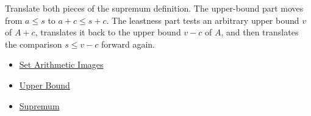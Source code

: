 \begin{remark*}
Translate both pieces of the supremum definition. The upper-bound part moves
from \(a\le s\) to \(a+c\le s+c\). The leastness part tests an arbitrary upper
bound \(v\) of \(A+c\), translates it back to the upper bound \(v-c\) of
\(A\), and then translates the comparison \(s\le v-c\) forward again.
\end{remark*}

\begin{dependencies}
\begin{itemize}
  \item \hyperref[def:set-arithmetic-images]{Set Arithmetic Images}
  \item \hyperref[def:real-upper-bound]{Upper Bound}
  \item \hyperref[def:supremum]{Supremum}
\end{itemize}
\end{dependencies}

\clearpage
